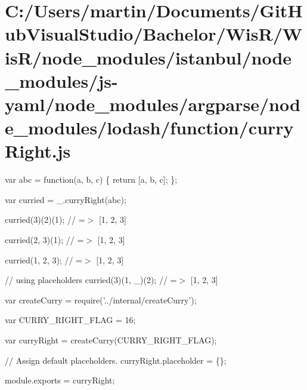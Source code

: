 \hypertarget{_c_1_2_users_2martin_2_documents_2_git_hub_visual_studio_2_bachelor_2_wis_r_2_wis_r_2node_modulea58d96330774a8fe5741a74a7f0c0315}{}\section{C\+:/\+Users/martin/\+Documents/\+Git\+Hub\+Visual\+Studio/\+Bachelor/\+Wis\+R/\+Wis\+R/node\+\_\+modules/istanbul/node\+\_\+modules/js-\/yaml/node\+\_\+modules/argparse/node\+\_\+modules/lodash/function/curry\+Right.\+js}
var abc = function(a, b, c) \{ return \mbox{[}a, b, c\mbox{]}; \};

var curried = \+\_\+.\+curry\+Right(abc);

curried(3)(2)(1); // =$>$ \mbox{[}1, 2, 3\mbox{]}

curried(2, 3)(1); // =$>$ \mbox{[}1, 2, 3\mbox{]}

curried(1, 2, 3); // =$>$ \mbox{[}1, 2, 3\mbox{]}

// using placeholders curried(3)(1, \+\_\+)(2); // =$>$ \mbox{[}1, 2, 3\mbox{]}


\begin{DoxyCodeInclude}
var createCurry = require(\textcolor{stringliteral}{'../internal/createCurry'});

var CURRY\_RIGHT\_FLAG = 16;

var curryRight = createCurry(CURRY\_RIGHT\_FLAG);

\textcolor{comment}{// Assign default placeholders.}
curryRight.placeholder = \{\};

module.exports = curryRight;
\end{DoxyCodeInclude}
 